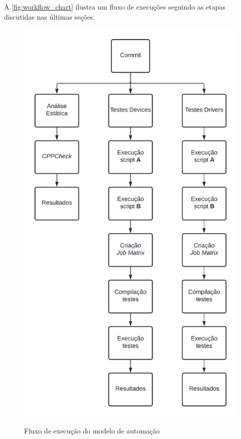             A \autoref{fig:workflow_chart} ilustra um fluxo de execuções seguindo as etapas discutidas nas últimas seções.
            
            
\begin{figure}[h!]
    \centering
    \caption{Fluxo de execução do modelo de automação}
    \includegraphics[scale=.15]{images/workflow_chart.png}
    \label{fig:workflow_chart}
\end{figure}